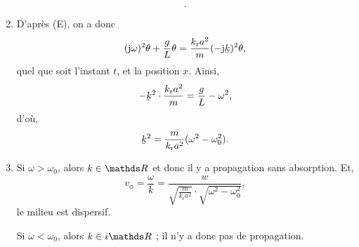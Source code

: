 \begin{enumerate}
\[		.\]
	\item D'après (E), on a donc \[
			(\mathrm{j} \omega)^2 \theta + \frac{g}{L} \theta = \frac{k_\mathrm{r} a^2}{m} (-\mathrm{j} \ubar{k})^2 \theta
		,\] quel que soit l'instant $t$, et la position $x$.
		Ainsi, \[
			-\ubar{k}^2 \cdot \frac{k_\mathrm{r} a^2}{m} = \frac{g}{L} - \omega^2
		,\] d'où, \[
			\ubar{k}^2 = \frac{m}{k_\mathrm{r} a^2} (\omega^2 - \omega_0^2)
		.\]
	\item Si $\omega > \omega_0$, alors $k \in \R$ et donc il y a propagation sans absorption. Et, \[
			v_{\phi} = \frac{\omega}{k} = \frac{w}{\sqrt{\frac{m}{k_\mathrm{r} a^2}} \cdot \sqrt{\omega^2 - \omega_0	^2} }
		,\]  le milieu est dispersif.
		
		Si $\omega < \omega_0$, alors $k \in i\R$ ; il n'y a donc pas de propagation.
\end{enumerate}
